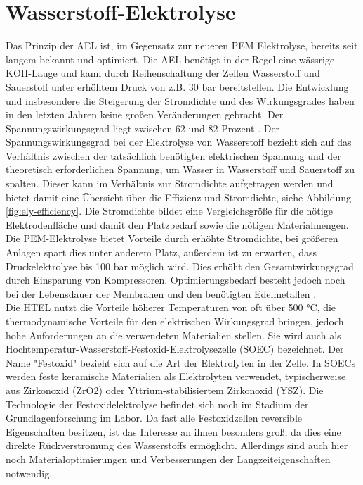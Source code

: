 \section{Wasserstoff-Elektrolyse}
\label{sec:Elektrolyse}
Das Prinzip der \gls{AEL} ist, im Gegensatz zur neueren \gls{PEM} Elektrolyse, bereits seit langem bekannt und optimiert. Die \gls{AEL} benötigt in der Regel eine wässrige KOH-Lauge und kann durch Reihenschaltung der Zellen Wasserstoff und Sauerstoff unter erhöhtem Druck von z.B. 30 bar bereitstellen. Die Entwicklung und insbesondere die Steigerung der Stromdichte und des Wirkungsgrades haben in den letzten Jahren keine großen Veränderungen gebracht. Der Spannungswirkungsgrad liegt zwischen 62 und 82 Prozent \cite{NOWH2}. Der Spannungswirkungsgrad bei der Elektrolyse von Wasserstoff bezieht sich auf das Verhältnis zwischen der tatsächlich benötigten elektrischen Spannung und der theoretisch erforderlichen Spannung, um Wasser in Wasserstoff und Sauerstoff zu spalten. Dieser kann im Verhältnis zur Stromdichte aufgetragen werden und bietet damit eine Übersicht über die Effizienz und Stromdichte, siehe Abbildung \ref{fig:ely-efficiency}. Die Stromdichte bildet eine Vergleichsgröße für die nötige Elektrodenfläche und damit den Platzbedarf sowie die nötigen Materialmengen.\\
Die \gls{PEM}-Elektrolyse bietet Vorteile durch erhöhte Stromdichte, bei größeren Anlagen spart dies unter anderem Platz, außerdem ist zu erwarten, dass Druckelektrolyse bis 100 bar möglich wird.  Dies erhöht den Gesamtwirkungsgrad durch Einsparung von Kompressoren. Optimierungsbedarf besteht jedoch noch bei der Lebensdauer der Membranen und den benötigten Edelmetallen \cite{NOWH2}. \\
Die \gls{HTEL} nutzt die Vorteile höherer Temperaturen von oft über 500 °C, die thermodynamische Vorteile für den elektrischen Wirkungsgrad bringen, jedoch hohe Anforderungen an die verwendeten Materialien stellen. Sie wird auch als Hochtemperatur-Wasserstoff-Festoxid-Elektrolysezelle (SOEC) bezeichnet. Der Name "Festoxid" bezieht sich auf die Art der Elektrolyten in der Zelle. In SOECs werden feste keramische Materialien als Elektrolyten verwendet, typischerweise aus Zirkonoxid (ZrO2) oder Yttrium-stabilisiertem Zirkonoxid (YSZ). Die Technologie der Festoxidelektrolyse befindet sich noch im Stadium der Grundlagenforschung im Labor. Da fast alle Festoxidzellen reversible Eigenschaften besitzen, ist das Interesse an ihnen besonders groß, da dies eine direkte Rückverstromung des Wasserstoffs ermöglicht. Allerdings sind auch hier noch Materialoptimierungen und Verbesserungen der Langzeiteigenschaften notwendig.\\

